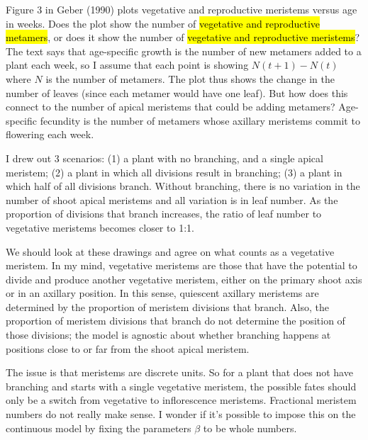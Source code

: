 \documentclass[12pt, oneside, titlepage]{article}   	%
\begin{document}
Figure 3 in Geber (1990) plots vegetative and reproductive meristems versus age in weeks. Does the plot show the number of \hl{vegetative and reproductive metamers}, or does it show the number of \hl{vegetative and reproductive meristems}? The text says that age-specific growth is the number of new metamers added to a plant each week, so I assume that each point is showing $N(t+1)-N(t)$ where $N$ is the number of metamers. The plot thus shows the change in the number of leaves (since each metamer would have one leaf). But how does this connect to the number of apical meristems that could be adding metamers? Age-specific fecundity is the number of metamers whose axillary meristems commit to flowering each week.

I drew out 3 scenarios: (1) a plant with no branching, and a single apical meristem; (2) a plant in which all divisions result in branching; (3) a plant in which half of all divisions branch. Without branching, there is no variation in the number of shoot apical meristems and all variation is in leaf number. As the proportion of divisions that branch increases, the ratio of leaf number to vegetative meristems becomes closer to 1:1. 

We should look at these drawings and agree on what counts as a vegetative meristem. In my mind, vegetative meristems are those that have the potential to divide and produce another vegetative meristem, either on the primary shoot axis or in an axillary position. In this sense, quiescent axillary meristems are determined by the proportion of meristem divisions that branch. Also, the proportion of meristem divisions that branch do not determine the position of those divisions; the model is agnostic about whether branching happens at positions close to or far from the shoot apical meristem.

The issue is that meristems are discrete units. So for a plant that does not have branching and starts with a single vegetative meristem, the possible fates should only be a switch from vegetative to inflorescence meristems. Fractional meristem numbers do not really make sense. I wonder if it's possible to impose this on the continuous model by fixing the parameters $\beta$ to be whole numbers.
\end{document}
